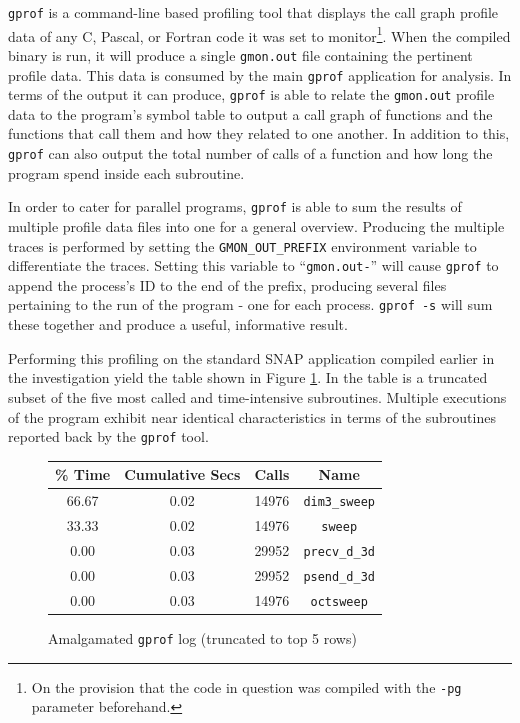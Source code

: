 \documentclass[conference]{IEEEtran}
\begin{document}
\texttt{gprof} is a command-line based profiling tool that displays the call graph profile data of any C, Pascal, or Fortran code it was set to monitor\footnote{On the provision that the code in question was compiled with the \texttt{-pg} parameter beforehand.}. When the compiled binary is run, it will produce a single \texttt{gmon.out} file containing the pertinent profile data. This data is consumed by the main \texttt{gprof} application for analysis. In terms of the output it can produce, \texttt{gprof} is able to relate the \texttt{gmon.out} profile data to the program's symbol table to output a call graph of functions and the functions that call them and how they related to one another. In addition to this, \texttt{gprof} can also output the total number of calls of a function and how long the program spend inside each subroutine.

In order to cater for parallel programs, \texttt{gprof} is able to sum the results of multiple profile data files into one for a general overview. Producing the multiple traces is performed by setting the \texttt{GMON\_OUT\_PREFIX} environment variable to differentiate the traces. Setting this variable to ``\texttt{gmon.out-}'' will cause \texttt{gprof} to append the process's ID to the end of the prefix, producing several files pertaining to the run of the program - one for each process. \texttt{gprof -s} will sum these together and produce a useful, informative result.

Performing this profiling on the standard SNAP application compiled earlier in the investigation yield the table shown in Figure \ref{table:gprof_log}. In the table is a truncated subset of the five most called and time-intensive subroutines. Multiple executions of the program exhibit near identical characteristics in terms of the subroutines reported back by the \texttt{gprof} tool.

\begin{figure}[!h]
    \centering
    \begin{tabular}{ | c | c | c | c | }
\hline
\% Time & Cumulative Secs & Calls & Name \\
\hline
66.67 & 0.02 & 14976 & \texttt{dim3\_sweep} \\
33.33 & 0.02 & 14976 & \texttt{sweep} \\
0.00  & 0.03 & 29952 & \texttt{precv\_d\_3d} \\
0.00  & 0.03 & 29952 & \texttt{psend\_d\_3d} \\
0.00  & 0.03 & 14976 & \texttt{octsweep} \\
\hline
    \end{tabular}
    \caption{Amalgamated \texttt{gprof} log (truncated to top 5 rows)}
    \label{table:gprof_log}
\end{figure}
\end{document}

